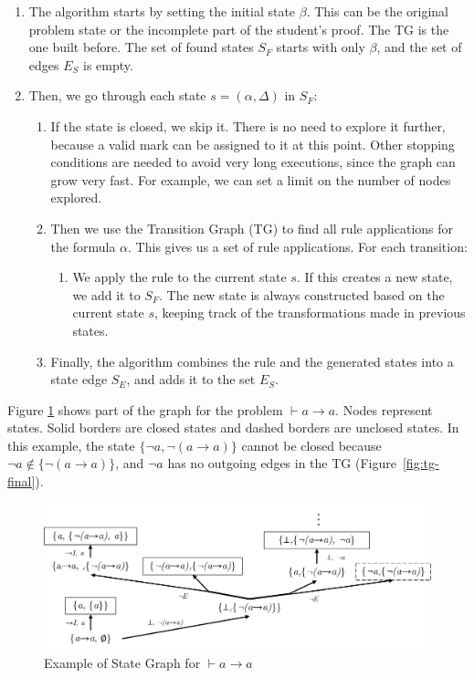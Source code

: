 \documentclass[runningheads]{llncs}
\begin{document}
\begin{enumerate}
    \item The algorithm starts by setting the initial state \(\beta\). This can be the original problem state or the incomplete part of the student's proof. The TG is the one built before. The set of found states \(S_F\) starts with only \(\beta\), and the set of edges \(E_S\) is empty.

    \item Then, we go through each state \(s = (\alpha, \Delta)\) in \(S_F\):

    \begin{enumerate}
        \item If the state is closed, we skip it. There is no need to explore it further, because a valid mark can be assigned to it at this point. Other stopping conditions are needed to avoid very long executions, since the graph can grow very fast. For example, we can set a limit on the number of nodes explored.

        \item Then we use the Transition Graph (TG) to find all rule applications for the formula \(\alpha\). This gives us a set of rule applications. For each transition:

        \begin{enumerate}
            \item We apply the rule to the current state \(s\). If this creates a new state, we add it to \(S_F\). The new state is always constructed based on the current state \(s\), keeping track of the transformations made in previous states.
        \end{enumerate}

        \item Finally, the algorithm combines the rule and the generated states into a state edge \(S_E\), and adds it to the set \(E_S\).
    \end{enumerate}
\end{enumerate}


Figure \ref{fig:st-ex} shows part of the graph for the problem \(\vdash a \to a\). Nodes represent states. Solid borders are closed states and dashed borders are unclosed states. In this example, the state $\{\lnot a, \lnot(a \to a)\}$ cannot be closed because $\lnot a \notin \{\lnot(a \to a)\}$, and $\lnot a$ has no outgoing edges in the TG (Figure~\ref{fig:tg-final}).

\begin{figure}
    \centering
    \includegraphics[width=1\linewidth]{resources/sg-gen.jpg}
    \caption{Example of State Graph for \(\vdash a \to a\)}
    \label{fig:st-ex}
\end{figure}
\end{document}
